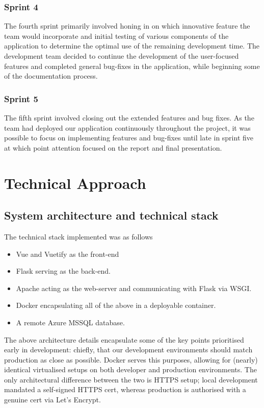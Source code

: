 \documentclass[]{UCD_CS_47360_Report}
\begin{document}
\subsection{Sprint 4}
The fourth sprint primarily involved honing in on which innovative feature the team would incorporate and initial testing of various components of the application to determine the optimal use of the remaining development time. The development team decided to continue the development of the user-focused features and completed general bug-fixes in the application, while beginning some of the documentation process.

\subsection{Sprint 5}
The fifth sprint involved closing out the extended features and bug fixes. As the team had deployed our application continuously throughout the project, it was possible to focus on implementing features and bug-fixes until late in sprint five at which point attention focused on the report and final presentation.
\chapter{\label{chapter4}Technical Approach}
\section{System architecture and technical stack}
The technical stack implemented was as follows
\begin{itemize}
    \item Vue and Vuetify as the front-end
    \item Flask serving as the back-end.
    \item Apache acting as the web-server and communicating with Flask via WSGI.
    \item Docker encapsulating all of the above in a deployable container.
    \item A remote Azure MSSQL database.
\end{itemize}

The above architecture details encapsulate some of the key points prioritised early in development: chiefly, that our development environments should match production as close as possible. Docker serves this purposes, allowing for (nearly) identical virtualised setups on both developer and production environments. The only architectural difference between the two is HTTPS setup; local development mandated a self-signed HTTPS cert, whereas production is authorised with a genuine cert via Let's Encrypt.
\end{document}
